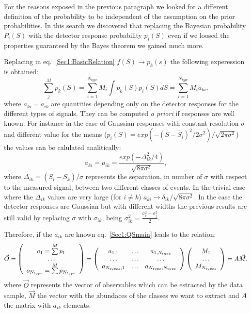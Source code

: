 For the reasons exposed in the previous paragraph we looked for a different definition of the probability to be independent of the assumption on the prior probabilities. In this search we discovered that replacing the Bayesian probability $P_{i}(S)$ with the detector response probability $p_{i}(S)$ even if we loosed the properties guaranteed by the Bayes theorem we gained much more.

Replacing in eq.~\ref{Sec1:BasicRelation} $f(S) \rightarrow p_{k}(s)$ the
following experession is obtained:
\begin{equation}
\label{Sec1:QSmain}
\sum\limits_{j}^{M}p_{k}(S) = \sum\limits_{i=1}^{N_{type}}M_{i}\int p_{k}(S)
p_{i}(S) dS = \sum\limits_{i=1}^{N_{type}}M_{i} a_{ki}, 
\end{equation}
where $a_{ki}=a_{ik}$ are quantities depending only on the detector responses
for the different types of signals.
They can be computed {\it a priori} if responses are well known.
For instance in the case of Gaussian responses with constant resolution
$\sigma$ and different value for the means ($p_{i}(S) =
exp(-(S-\bar{S}_{i})^{2}/2\sigma^{2})/\sqrt{2\pi\sigma^{2}}$) the values can
be calulated analitically:
\begin{equation}
\label{Sec1:GaussianMatrixElements}
a_{ki} = a_{ik} = \frac{exp(-\Delta_{ik}^{2}/4)}{\sqrt{8\pi\sigma^2}},
\end{equation}
where $\Delta_{ik}=(\bar{S}_{i} - \bar{S}_{k})/\sigma$ represents the
separation, in number of $\sigma$
with respect to the measured signal, between two different classes of events.
In the trivial case where the $\Delta_{ik}$ values are very large (for $i \neq
k$) $a_{ki} \rightarrow \delta_{ik} / \sqrt{8\pi\sigma^2}$.
In the case the detector responses are Gaussian but with different
widths the previous results are still valid by replacing $\sigma$ with
$\sigma_{ik}$,  being $\sigma_{ik}^2 = \frac{\sigma_{i}^2 + \sigma_{j}^2}{2}$.

Therefore, if the $a_{ik}$ are known eq.~\ref{Sec1:QSmain} leads to the
relation:
\begin{equation}
\label{Sec1:QSformula}
\vec{O} =
 \left(
\begin{array}{c}
o_1 = \sum\limits^{M} p_{1}\\
\ldots \\
o_{N_{type}}=\sum\limits^{M} p_{N_{type}}
\end{array}
\right) =
\left(
\begin{array}{ccc}
a_{1,1} & \ldots & a_{1,N_{type}} \\
\ldots & \ldots & \ldots \\
a_{N_{types},1} & \ldots & a_{N_{type},N_{type}}
\end{array}
\right)
\left(
\begin{array}{c}
M_{1}\\
\ldots \\
M_{N_{types}}
\end{array}
\right) =
\boldmath{A} \vec{M},
\end{equation}
where $\vec{O}$ represents the vector of observables which can be estracted by the data
sample, $\vec{M}$ the vector with the abundaces of the classes we want to
extract and $\boldmath{A}$ the matrix with $a_{ik}$ elements.

